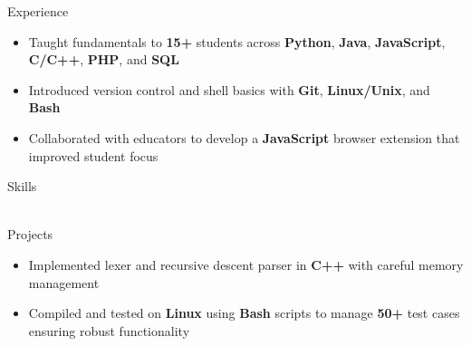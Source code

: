 \documentclass{resume}
\begin{document}
\begin{experienceSection}{Experience}
    \experienceItem[
        company={theCoderSchool},
        location={Berkeley Heights, NJ},
        position={Code Tutor},
        duration={March 2024 - August 2024}
    ]
    \begin{itemize}[itemsep=-6pt, leftmargin=2em, rightmargin=0.8em, before=\raggedright, after=\normalfont]
        \item Taught fundamentals to \textbf{15+} students across \textbf{Python}, \textbf{Java}, \textbf{JavaScript}, \textbf{C/C++}, \textbf{PHP}, and \textbf{SQL}
        \item Introduced version control and shell basics with \textbf{Git}, \textbf{Linux/Unix}, and \textbf{Bash}
        \item Collaborated with educators to develop a \textbf{JavaScript} browser extension that improved student focus
    \end{itemize}

\end{experienceSection}

\begin{skillsSection}{Skills}
    \skillItem[
        category={Languages},
        skills={Python, C, C++, JavaScript, TypeScript, SQL}
    ] \\
    \skillItem[
        category={Full-Stack},
        skills={React, Next.js, Vue, Node.js, MongoDB, Zustand, Tailwind CSS, Slack SDK, Zendesk API}
    ] \\
    \skillItem[
        category={DevOps \& Tooling},
        skills={AWS, Datadog, Kubernetes, Terraform, Argo CD, CircleCI, Git, Bash}
    ]
\end{skillsSection}

\begin{experienceSection}{Projects}
    \projectItem[
        title={Mini C-Like Programming Language},
    ]
    \vspace{-0.5em}
    \begin{itemize}[topsep=0pt, itemsep=-6pt, leftmargin=2em, rightmargin=0.8em, before=\raggedright, after=\normalfont]
        \item Implemented lexer and recursive descent parser in \textbf{C++} with careful memory management
        \item Compiled and tested on \textbf{Linux} using \textbf{Bash} scripts to manage \textbf{50+} test cases ensuring robust functionality 
    \end{itemize}
\end{experienceSection}
\end{document}
